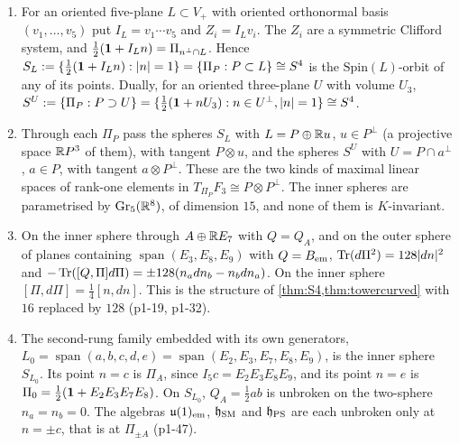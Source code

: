 \begin{proposition}
\label{p1:prop:spheres}
\begin{enumerate}[label=(\roman*),leftmargin=2.2em]
\item For an oriented five-plane $L\subset V_+$ with oriented orthonormal basis $(v_1,\dots,v_5)$ put $I_L=v_1\cdots v_5$ and $Z_i=I_Lv_i$. The $Z_i$ are a symmetric Clifford
system, and $\tfrac12(\mathbf 1+I_Ln)=\Pi_{n^\perp\cap L}$. Hence $S_L:=\{\tfrac12(\mathbf 1+I_Ln):|n|=1\}=\{\Pi_P:P\subset L\}\cong S^4$ is the $\mathrm{Spin}(L)$-orbit of any of its points.
Dually, for an oriented three-plane $U$ with volume $U_3$, $S^U:=\{\Pi_P:P\supset U\}=\{\tfrac12(\mathbf 1+nU_3):n\in U^\perp,|n|=1\}\cong S^4$.
\item Through each $\Pi_P$ pass the spheres $S_L$ with $L=P\oplus\mathbb{R} u$, $u\in P^\perp$ (a projective space $\mathbb{R} P^3$ of them), with tangent $P\otimes u$, and the spheres $S^U$
with $U=P\cap a^\perp$, $a\in P$, with tangent $a\otimes P^\perp$. These are the two kinds of maximal linear spaces of rank-one elements in $T_{\Pi_P}F_3\cong P\otimes P^\perp$. The
inner spheres are parametrised by $\mathrm{Gr}_5(\mathbb{R}^8)$, of dimension $15$, and none of them is $K$-invariant.
\item On the inner sphere through $A\oplus\mathbb{R} E_7$ with $Q=Q_A$, and on the outer sphere of planes containing $\operatorname{span}(E_3,E_8,E_9)$ with $Q=B_{\rm em}$,
$\operatorname{Tr}(d\Pi^2)=128|dn|^2$ and $-\operatorname{Tr}([Q,\Pi]d\Pi)=\pm128(n_adn_b-n_bdn_a)$. On the inner sphere $[\Pi,d\Pi]=\tfrac14[n,dn]$. This is the structure of
\cref{thm:S4,thm:towercurved} with $16$ replaced by $128$ (p1-19, p1-32).
\item The second-rung family embedded with its own generators, $L_0=\operatorname{span}(a,b,c,d,e)=\operatorname{span}(E_2,E_3,E_7,E_8,E_9)$, is the inner sphere $S_{L_0}$. Its
point $n=c$ is $\Pi_A$, since $I_5c=E_2E_3E_8E_9$, and its point $n=e$ is $\Pi_0=\tfrac12(\mathbf 1+E_2E_3E_7E_8)$. On $S_{L_0}$, $Q_A=\tfrac12ab$ is unbroken on the two-sphere
$n_a=n_b=0$. The algebras $\mathfrak{u}(1)_{\rm em}$, $\mathfrak h_{\rm SM}$ and $\mathfrak h_{\rm PS}$ are each unbroken only at $n=\pm c$, that is at $\Pi_{\pm A}$ (p1-47).
\end{enumerate}
\end{proposition}

